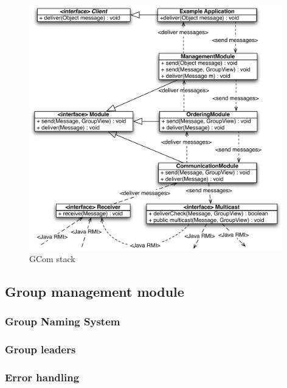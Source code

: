 \documentclass[titlepage, twocolumn, a4paper, 10pt]{article}
\begin{document}
\begin{figure}[!t]
  \centerline{\includegraphics[width=110mm]{images/Stack.pdf}}
  \caption{GCom stack}
  \label{fig:images/Stack}
\end{figure}



\subsection{Group management module}\label{sec:group-management-module}

\subsubsection{Group Naming System}\label{sec:group-naming-system}

\subsubsection{Group leaders}\label{sec:group-leaders}

\subsubsection{Error handling}\label{sec:error-handling}
\end{document}
